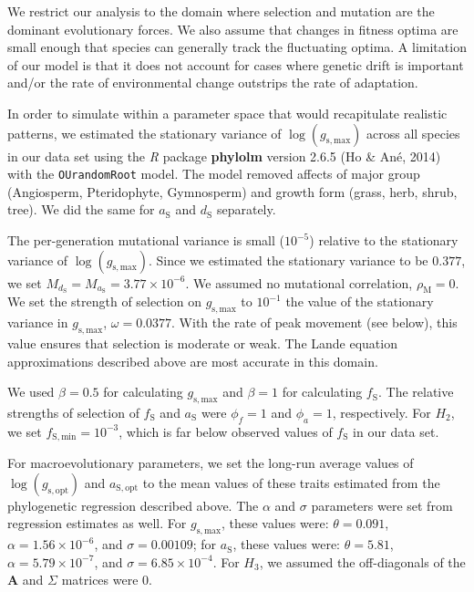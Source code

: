 \documentclass[
  letterpaper,
  DIV=11,
  numbers=noendperiod]{scrartcl}
\begin{document}
We restrict our analysis to the domain where selection and mutation are
the dominant evolutionary forces. We also assume that changes in fitness
optima are small enough that species can generally track the fluctuating
optima. A limitation of our model is that it does not account for cases
where genetic drift is important and/or the rate of environmental change
outstrips the rate of adaptation.

In order to simulate within a parameter space that would recapitulate
realistic patterns, we estimated the stationary variance of
\(\log \left( g_\mathrm{s,max} \right)\) across all species in our data
set using the \emph{R} package \textbf{phylolm} version 2.6.5 (Ho \&
Ané, 2014) with the \texttt{OUrandomRoot} model. The model removed
affects of major group (Angiosperm, Pteridophyte, Gymnosperm) and growth
form (grass, herb, shrub, tree). We did the same for \(a_\mathrm{S}\)
and \(d_\mathrm{S}\) separately.

The per-generation mutational variance is small (\(10^{-5}\)) relative
to the stationary variance of \(\log \left( g_\mathrm{s,max} \right)\).
Since we estimated the stationary variance to be \(0.377\), we set
\(M_{d_\mathrm{S}} = M_{a_\mathrm{S}} = 3.77 \times 10 ^ {-6}\). We
assumed no mutational correlation, \(\rho_\mathrm{M} = 0\). We set the
strength of selection on \(g_\mathrm{s,max}\) to \(10^{-1}\) the value
of the stationary variance in \(g_\mathrm{s,max}\), \(\omega = 0.0377\).
With the rate of peak movement (see below), this value ensures that
selection is moderate or weak. The Lande equation approximations
described above are most accurate in this domain.

We used \(\beta = 0.5\) for calculating \(g_\mathrm{s,max}\) and
\(\beta = 1\) for calculating \(f_\mathrm{S}\). The relative strengths
of selection of \(f_\mathrm{S}\) and \(a_\mathrm{S}\) were
\(\phi_f = 1\) and \(\phi_a = 1\), respectively. For \(H_2\), we set
\(f_\mathrm{S,min} = 10^{-3}\), which is far below observed values of
\(f_\mathrm{S}\) in our data set.

For macroevolutionary parameters, we set the long-run average values of
\(\log \left( g_\mathrm{s,opt} \right)\) and \(a_\mathrm{S,opt}\) to the
mean values of these traits estimated from the phylogenetic regression
described above. The \(\alpha\) and \(\sigma\) parameters were set from
regression estimates as well. For \(g_\mathrm{s,max}\), these values
were: \(\theta = 0.091\), \(\alpha = 1.56 \times 10 ^ {-6}\), and
\(\sigma = 0.00109\); for \(a_\mathrm{S}\), these values were:
\(\theta = 5.81\), \(\alpha = 5.79 \times 10 ^ {-7}\), and
\(\sigma = 6.85 \times 10 ^ {-4}\). For \(H_3\), we assumed the
off-diagonals of the \(\mathbf{A}\) and \(\Sigma\) matrices were 0.
\end{document}
